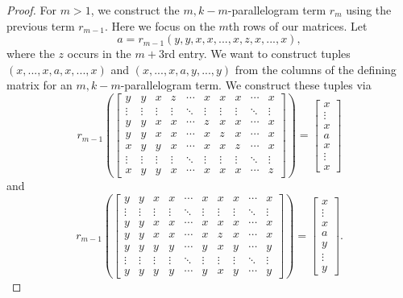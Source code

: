 \documentclass[letterpaper,11pt]{article}
\begin{document}
\begin{proof}
For $m > 1$, we construct the $m,k-m$-parallelogram term $r_m$ using the previous term $r_{m-1}$. Here we focus on the $m$th rows of our matrices. Let
\[
a = r_{m-1}(y,y,x,x,...,x,z,x,...,x),
\]
where the $z$ occurs in the $m+3$rd entry. We want to construct tuples $(x,...,x,a,x,...,x)$ and $(x,...,x,a,y,...,y)$ from the columns of the defining matrix for an $m,k-m$-parallelogram term. We construct these tuples via
\[
r_{m-1}\left(\begin{bmatrix} y & y & x & z & \cdots & x & x & x & \cdots & x\\ \vdots & \vdots & \vdots & \vdots & \ddots & \vdots & \vdots & \vdots & \ddots & \vdots \\ y & y & x & x & \cdots & z & x & x & \cdots & x\\ y & y & x & x & \cdots & x & z & x & \cdots & x\\ x & y & y & x & \cdots & x & x & z & \cdots & x\\ \vdots & \vdots & \vdots & \vdots & \ddots & \vdots & \vdots & \vdots & \ddots & \vdots \\ x & y & y & x & \cdots & x & x & x & \cdots & z\end{bmatrix}\right) = \begin{bmatrix} x\\ \vdots \\ x\\ a\\ x\\ \vdots \\ x\end{bmatrix}
\]
and
\[
r_{m-1}\left(\begin{bmatrix} y & y & x & x & \cdots & x & x & x & \cdots & x\\ \vdots & \vdots & \vdots & \vdots & \ddots & \vdots & \vdots & \vdots & \ddots & \vdots \\ y & y & x & x & \cdots & x & x & x & \cdots & x\\ y & y & x & x & \cdots & x & z & x & \cdots & x\\ y & y & y & y & \cdots & y & x & y & \cdots & y\\ \vdots & \vdots & \vdots & \vdots & \ddots & \vdots & \vdots & \vdots & \ddots & \vdots \\ y & y & y & y & \cdots & y & x & y & \cdots & y\end{bmatrix}\right) = \begin{bmatrix} x\\ \vdots \\ x\\ a\\ y\\ \vdots \\ y\end{bmatrix}.
\]
\end{proof}
\end{document}
